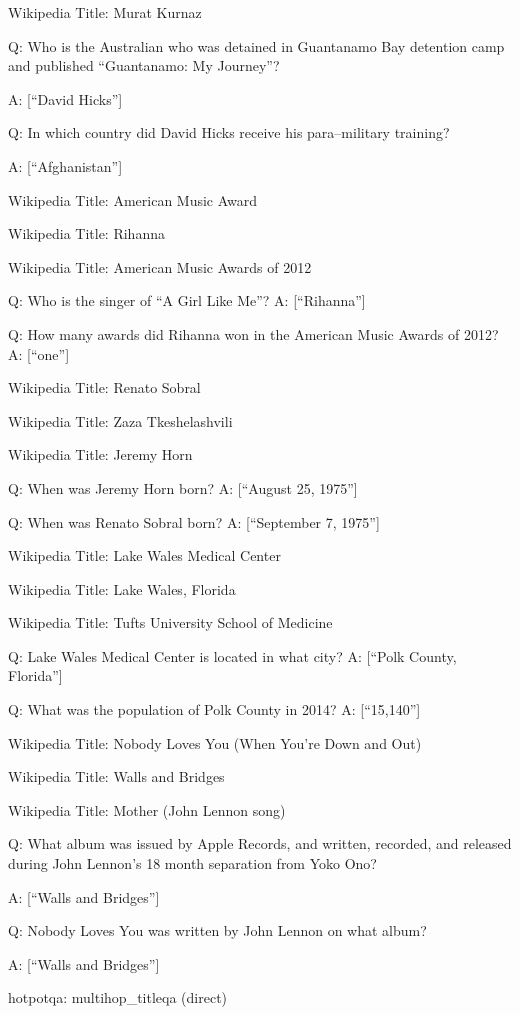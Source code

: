 \documentclass[
]{article}
\begin{document}
Wikipedia Title: Murat Kurnaz

Q: Who is the Australian who was detained in Guantanamo Bay detention
camp and published ``Guantanamo: My Journey''?

A: {[}``David Hicks''{]}

Q: In which country did David Hicks receive his para--military training?

A: {[}``Afghanistan''{]}

Wikipedia Title: American Music Award

Wikipedia Title: Rihanna

Wikipedia Title: American Music Awards of 2012

Q: Who is the singer of ``A Girl Like Me''? A: {[}``Rihanna''{]}

Q: How many awards did Rihanna won in the American Music Awards of 2012?
A: {[}``one''{]}

Wikipedia Title: Renato Sobral

Wikipedia Title: Zaza Tkeshelashvili

Wikipedia Title: Jeremy Horn

Q: When was Jeremy Horn born? A: {[}``August 25, 1975''{]}

Q: When was Renato Sobral born? A: {[}``September 7, 1975''{]}

Wikipedia Title: Lake Wales Medical Center

Wikipedia Title: Lake Wales, Florida

Wikipedia Title: Tufts University School of Medicine

Q: Lake Wales Medical Center is located in what city? A: {[}``Polk
County, Florida''{]}

Q: What was the population of Polk County in 2014? A: {[}``15,140''{]}

Wikipedia Title: Nobody Loves You (When You're Down and Out)

Wikipedia Title: Walls and Bridges

Wikipedia Title: Mother (John Lennon song)

Q: What album was issued by Apple Records, and written, recorded, and
released during John Lennon's 18 month separation from Yoko Ono?

A: {[}``Walls and Bridges''{]}

Q: Nobody Loves You was written by John Lennon on what album?

A: {[}``Walls and Bridges''{]}

hotpotqa: multihop\_titleqa (direct)
\end{document}
